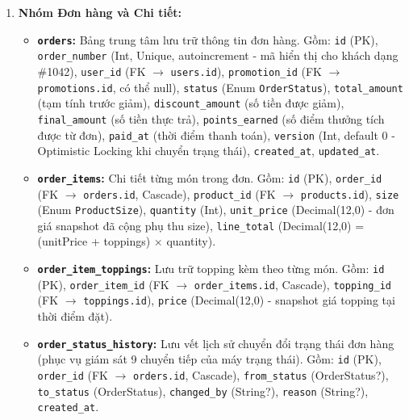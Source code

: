 \begin{enumerate}
    \item \textbf{Nhóm Đơn hàng và Chi tiết:}
    \begin{itemize}
        \item \textbf{\texttt{orders}:} Bảng trung tâm lưu trữ thông tin đơn hàng. Gồm: \texttt{id} (PK), \texttt{order\_number} (Int, Unique, autoincrement - mã hiển thị cho khách dạng \#1042), \texttt{user\_id} (FK \(\to\) \texttt{users.id}), \texttt{promotion\_id} (FK \(\to\) \texttt{promotions.id}, có thể null), \texttt{status} (Enum \texttt{OrderStatus}), \texttt{total\_amount} (tạm tính trước giảm), \texttt{discount\_amount} (số tiền được giảm), \texttt{final\_amount} (số tiền thực trả), \texttt{points\_earned} (số điểm thưởng tích được từ đơn), \texttt{paid\_at} (thời điểm thanh toán), \texttt{version} (Int, default 0 - Optimistic Locking khi chuyển trạng thái), \texttt{created\_at}, \texttt{updated\_at}.
        \item \textbf{\texttt{order\_items}:} Chi tiết từng món trong đơn. Gồm: \texttt{id} (PK), \texttt{order\_id} (FK \(\to\) \texttt{orders.id}, Cascade), \texttt{product\_id} (FK \(\to\) \texttt{products.id}), \texttt{size} (Enum \texttt{ProductSize}), \texttt{quantity} (Int), \texttt{unit\_price} (Decimal(12,0) - đơn giá snapshot đã cộng phụ thu size), \texttt{line\_total} (Decimal(12,0) = (unitPrice + toppings) \(\times\) quantity).
        \item \textbf{\texttt{order\_item\_toppings}:} Lưu trữ topping kèm theo từng món. Gồm: \texttt{id} (PK), \texttt{order\_item\_id} (FK \(\to\) \texttt{order\_items.id}, Cascade), \texttt{topping\_id} (FK \(\to\) \texttt{toppings.id}), \texttt{price} (Decimal(12,0) - snapshot giá topping tại thời điểm đặt).
        \item \textbf{\texttt{order\_status_history}:} Lưu vết lịch sử chuyển đổi trạng thái đơn hàng (phục vụ giám sát 9 chuyển tiếp của máy trạng thái). Gồm: \texttt{id} (PK), \texttt{order\_id} (FK \(\to\) \texttt{orders.id}, Cascade), \texttt{from\_status} (OrderStatus?), \texttt{to\_status} (OrderStatus), \texttt{changed\_by} (String?), \texttt{reason} (String?), \texttt{created\_at}.
    \end{itemize}


\end{enumerate}
